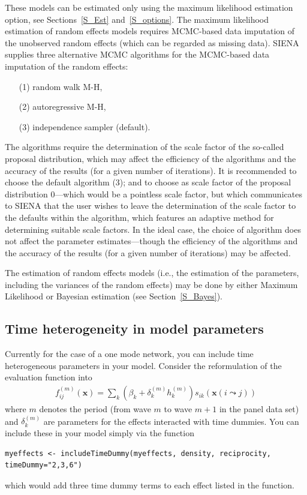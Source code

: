 \documentclass[a4paper,fleqn]{article}
\newcommand{\+}{\, + \,}
\newcommand{\SI}{{\sf SIENA }}
\begin{document}
{These models can be estimated only using the maximum likelihood
estimation option, see Sections~\ref{S_Est} and~\ref{S_options}.
The maximum likelihood estimation of random effects models requires MCMC-based data
imputation of the unobserved random effects (which can be regarded as missing data).
\SI supplies three alternative MCMC algorithms for the MCMC-based
data imputation of the random effects:
\begin{itemize}
\item[(1)] random walk M-H,
\item[(2)] autoregressive M-H,
\item[(3)] independence sampler (default).
\end{itemize}
The algorithms require the determination of the scale factor of the so-called proposal distribution,
which may affect the efficiency of the algorithms and
the accuracy of the results (for a given number of iterations).
It is recommended to choose the default algorithm (3);
and to choose as scale factor of the proposal distribution $0$---which
would be a pointless scale factor, but which communicates to \SI
that the user wishes to leave the determination of the scale factor to
the defaults within the algorithm,
which features an adaptive method for determining suitable scale factors.
In the ideal case, the choice of algorithm does not affect the
parameter estimates---though the efficiency of
the algorithms and the accuracy of the results (for a given number of iterations) may be affected.

The estimation of random effects models (i.e., the estimation of the parameters,
including the variances of the random effects) may be done by either Maximum Likelihood
or Bayesian estimation (see Section~\ref{S_Bayes}).

\fi

\subsection{Time heterogeneity in model parameters}
\label{S_timetest1}

Currently for the case of a one mode network, you can include
time heterogeneous parameters in your model. Consider the reformulation of
the evaluation function into
\begin{align}
f^{(m)}_{ij}(\mathbf{x})= \sum_k (\beta_k + \delta_k^{(m)} h_k^{(m)}) s_{ik}(\mathbf{x}(i \leadsto j))
\label{eq:fmij}
\end{align}
where $m$ denotes the period (from wave $m$ to wave $m+1$ in the panel data set)
and $\delta_k^{(m)}$ are parameters for the effects interacted
with time dummies. You
can include these in your model simply via the function
\begin{verbatim}
myeffects <- includeTimeDummy(myeffects, density, reciprocity, timeDummy="2,3,6")
\end{verbatim}
which would add three time dummy terms to each effect listed in the function.

}
\end{document}
